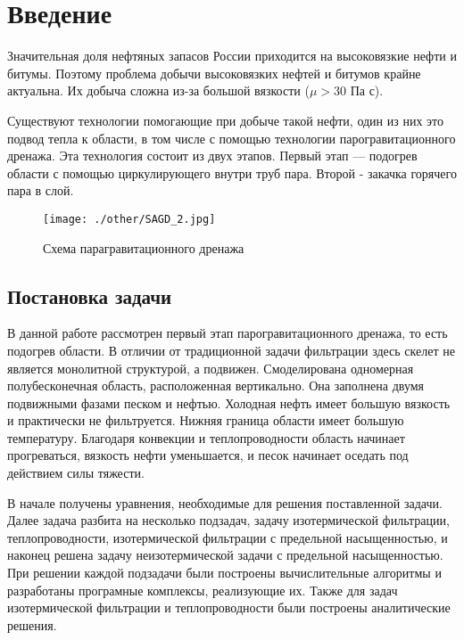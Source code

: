 \documentclass[12pt,a4paper]{article}
\begin{document}
\newpage
\tableofcontents
\newpage
\section{Введение}


Значительная доля нефтяных запасов России приходится на высоковязкие нефти и битумы. Поэтому проблема добычи высоковязких нефтей и битумов крайне актуальна. Их добыча сложна из-за большой вязкости ($\mu > 30$ Па с). 

Существуют технологии помогающие при добыче такой нефти, один из них это подвод тепла к области, в том числе с помощью технологии парогравитационного дренажа. Эта технология состоит из двух этапов. Первый этап — подогрев области с помощью циркулирующего внутри труб пара. Второй - закачка горячего пара в слой.

\begin{figure}[h!]
\begin{center}
\texttt{[image: ./other/SAGD\_2.jpg]}
\caption{Схема парагравитационного дренажа}
\end{center}
\end{figure}

\subsection {Постановка задачи}

В данной работе рассмотрен первый этап парогравитационного дренажа, то есть подогрев области. В отличии от традиционной задачи фильтрации здесь скелет не является монолитной структурой, а подвижен. Смоделирована одномерная полубесконечная область, расположенная вертикально. Она заполнена двумя подвижными фазами песком и нефтью. Холодная нефть имеет большую вязкость и практически не фильтруется. Нижняя граница области имеет большую температуру. Благодаря конвекции и теплопроводности область начинает прогреваться, вязкость нефти уменьшается, и песок начинает оседать под действием силы тяжести.

В начале получены уравнения, необходимые для решения поставленной задачи. Далее задача разбита на несколько подзадач, задачу изотермической фильтрации, теплопроводности, изотермической фильтрации с предельной насыщенностью, и наконец решена задачу неизотермической задачи с предельной насыщенностью. При решении каждой подзадачи были построены вычислительные алгоритмы и разработаны програмные комплексы, реализующие их. Также для задач изотермической фильтрации и теплопроводности были построены аналитические решения.
\end{document}

